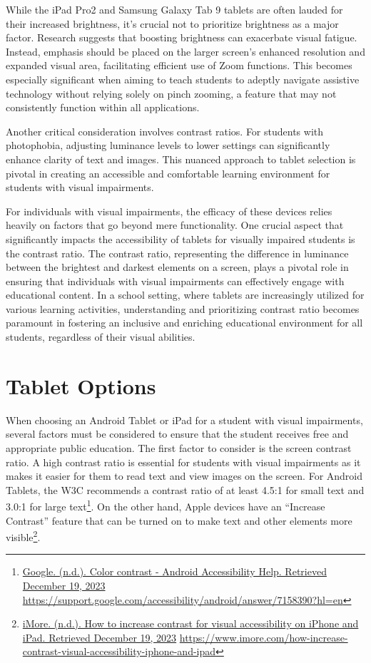 \documentclass[12pt,letterpaper,twoside,openright]{report}
\begin{document}
While the iPad Pro2 and Samsung Galaxy Tab 9 tablets are often lauded for their increased brightness, it's crucial not to prioritize brightness as a major factor. Research suggests that boosting brightness can exacerbate visual fatigue. Instead, emphasis should be placed on the larger screen's enhanced resolution and expanded visual area, facilitating efficient use of Zoom functions. This becomes especially significant when aiming to teach students to adeptly navigate assistive technology without relying solely on pinch zooming, a feature that may not consistently function within all applications.

Another critical consideration involves contrast ratios. For students with photophobia, adjusting luminance levels to lower settings can significantly enhance clarity of text and images. This nuanced approach to tablet selection is pivotal in creating an accessible and comfortable learning environment for students with visual impairments.

For individuals with visual impairments, the efficacy of these devices relies heavily on factors that go beyond mere functionality. One crucial aspect that significantly impacts the accessibility of tablets for visually impaired students is the contrast ratio. The contrast ratio, representing the difference in luminance between the brightest and darkest elements on a screen, plays a pivotal role in ensuring that individuals with visual impairments can effectively engage with educational content. In a school setting, where tablets are increasingly utilized for various learning activities, understanding and prioritizing contrast ratio becomes paramount in fostering an inclusive and enriching educational environment for all students, regardless of their visual abilities.


\pagebreak	\hypertarget{tablet-options}{}\section{Tablet Options}\label{tab:tablelet-options}
When choosing an Android Tablet or iPad for a student with visual impairments, several factors must be considered to ensure that the student receives free and appropriate public education. The first factor to consider is the screen contrast ratio. A high contrast ratio is essential for students with visual impairments as it makes it easier for them to read text and view images on the screen. For Android Tablets, the W3C recommends a contrast ratio of at least 4.5:1 for small text and 3.0:1 for large text\footnote{\raggedright \href{https://support.google.com/accessibility/android/answer/7158390?hl=en}{Google. (n.d.). Color contrast - Android Accessibility Help. Retrieved December 19, 2023} \url{https://support.google.com/accessibility/android/answer/7158390?hl=en}}. On the other hand, Apple devices have an “Increase Contrast” feature that can be turned on to make text and other elements more visible\footnote{\raggedright \href{https://www.imore.com/how-increase-contrast-visual-accessibility-iphone-and-ipad}{iMore. (n.d.). How to increase contrast for visual accessibility on iPhone and iPad. Retrieved December 19, 2023} \url{https://www.imore.com/how-increase-contrast-visual-accessibility-iphone-and-ipad}}.
\end{document}
